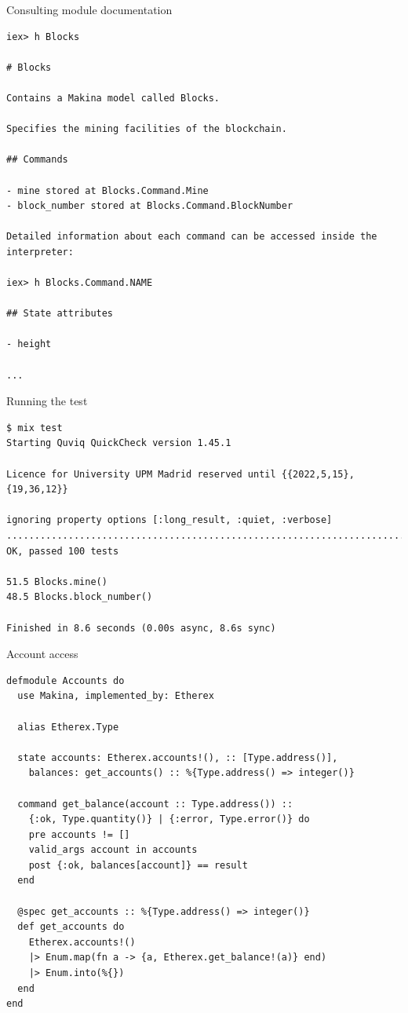 \documentclass[aspectratio=169, 10pt]{beamer}
\begin{document}
\begin{frame}[label={sec:orgb4f75c2},fragile]{Consulting module documentation}
 \lstset{language=shell,label= ,caption= ,captionpos=b,numbers=none,style=display}
\begin{lstlisting}
iex> h Blocks

# Blocks

Contains a Makina model called Blocks.

Specifies the mining facilities of the blockchain.

## Commands

- mine stored at Blocks.Command.Mine
- block_number stored at Blocks.Command.BlockNumber

Detailed information about each command can be accessed inside the interpreter:

iex> h Blocks.Command.NAME

## State attributes

- height

...
\end{lstlisting}
\end{frame}
\begin{frame}[label={sec:org5bdb433},fragile]{Running the test}
 \lstset{language=shell,label= ,caption= ,captionpos=b,numbers=none,style=display}
\begin{lstlisting}
$ mix test
Starting Quviq QuickCheck version 1.45.1

Licence for University UPM Madrid reserved until {{2022,5,15},{19,36,12}}

ignoring property options [:long_result, :quiet, :verbose]
....................................................................................................
OK, passed 100 tests

51.5 Blocks.mine()
48.5 Blocks.block_number()

Finished in 8.6 seconds (0.00s async, 8.6s sync)
\end{lstlisting}
\end{frame}
\begin{frame}[label={sec:org89605a5},fragile]{Account access}
 \lstset{language=elixir,label= ,caption= ,captionpos=b,numbers=none,style=display}
\begin{lstlisting}
defmodule Accounts do
  use Makina, implemented_by: Etherex

  alias Etherex.Type

  state accounts: Etherex.accounts!(), :: [Type.address()],
	balances: get_accounts() :: %{Type.address() => integer()}

  command get_balance(account :: Type.address()) ::
    {:ok, Type.quantity()} | {:error, Type.error()} do
    pre accounts != []
    valid_args account in accounts
    post {:ok, balances[account]} == result
  end

  @spec get_accounts :: %{Type.address() => integer()}
  def get_accounts do
    Etherex.accounts!()
    |> Enum.map(fn a -> {a, Etherex.get_balance!(a)} end)
    |> Enum.into(%{})
  end
end
\end{lstlisting}
\end{frame}
\end{document}
